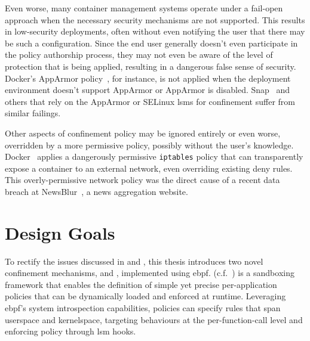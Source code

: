 Even worse, many container management systems operate under a fail-open approach when the
necessary security mechanisms are not supported. This results in low-security deployments,
often without even notifying the user that there may be such a configuration. Since the
end user generally doesn't even participate in the policy authorship process, they may not
even be aware of the level of protection that is being applied, resulting in a dangerous
false sense of security. Docker's AppArmor policy~\cite{docker_apparmor,
docker_default_apparmor}, for instance, is not applied when the deployment environment
doesn't support AppArmor or AppArmor is disabled. Snap~\cite{snap} and others that rely on
the AppArmor or SELinux \glspl{lsm} for confinement suffer from similar failings.

Other aspects of confinement policy may be ignored entirely or even worse, overridden by
a more permissive policy, possibly without the user's knowledge.
Docker~\cite{docker_security} applies a dangerously permissive \texttt{iptables} policy
that can transparently expose a container to an external network, even overriding existing
deny rules. This overly-permissive network policy was the direct cause of a recent data
breach at NewsBlur~\cite{newsblur}, a news aggregation website.



\section{Design Goals}%
\label{s:cp-design}


To rectify the issues discussed in  and , this
thesis introduces two novel confinement mechanisms, \bpfbox{} and \bpfcontain{},
implemented using \gls{ebpf}. \bpfbox{} (c.f.\ ) is a sandboxing framework
that enables the definition of simple yet precise per-application policies that can be
dynamically loaded and enforced at runtime. Leveraging \gls{ebpf}'s system
introspection capabilities, \bpfbox{} policies can specify rules that span userspace and
kernelspace, targeting behaviours at the per-function-call level and enforcing policy
through \gls{lsm} hooks.

